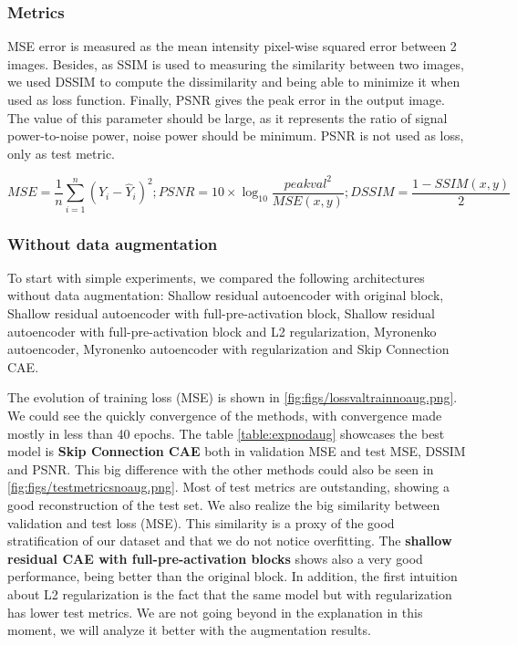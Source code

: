 \subsubsection{Metrics}

MSE error is measured as the mean intensity pixel-wise squared error between 2 images. Besides, as SSIM is used to measuring the similarity between two images, we used DSSIM to compute the dissimilarity and being able to minimize it when used as loss function. Finally, PSNR gives the peak error in the output image. The value of this parameter should be large, as it represents the ratio of signal power-to-noise power, noise power should be minimum. PSNR is not used as loss, only as test metric. 

$$MSE = \frac{1}{n} \sum^{n}_{i=1}(Y_i-\hat{Y}_i)^2; PSNR=10\times \log_{10}\frac{peakval^2}{MSE(x,y)}; DSSIM = \frac{1-SSIM(x,y)}{2}$$


\subsubsection{Without data augmentation}

To start with simple experiments, we compared the following architectures without data augmentation: Shallow residual autoencoder with original block,  Shallow residual autoencoder with full-pre-activation block, Shallow residual autoencoder with full-pre-activation block and L2 regularization, Myronenko autoencoder, Myronenko autoencoder with regularization and Skip Connection CAE.


The evolution of training loss (MSE) is shown in \ref{fig:figs/lossvaltrainnoaug.png}. We could see the quickly convergence of the methods, with convergence made mostly in less than 40 epochs. The table \ref{table:expnodaug} showcases the best model is \textbf{Skip Connection CAE} both in validation MSE and test MSE, DSSIM and PSNR. This big difference with the other methods could also be seen in \ref{fig:figs/testmetricsnoaug.png}. Most of test metrics are outstanding, showing a good reconstruction of the test set. We also realize the big similarity between validation and test loss (MSE). This similarity is a proxy of the good stratification of our dataset and that we do not notice overfitting. The \textbf{shallow residual CAE with full-pre-activation blocks} shows also a very good performance, being better than the original block. In addition, the first intuition about L2 regularization is the fact that the same model but with regularization has lower test metrics. We are not going beyond in the explanation in this moment, we will analyze it better with the augmentation results.

